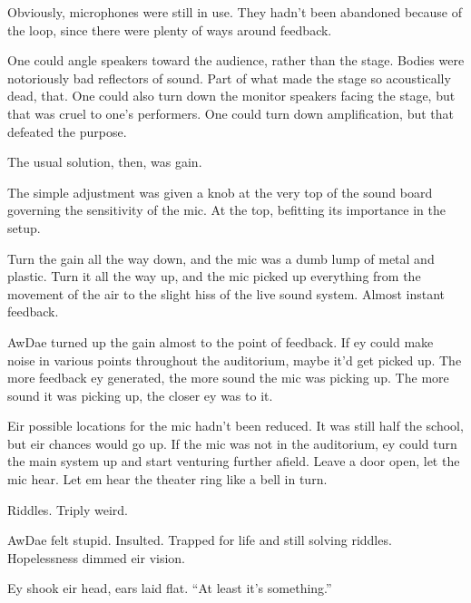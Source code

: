 Obviously, microphones were still in use. They hadn't been abandoned because of the loop, since there were plenty of ways around feedback.

One could angle speakers toward the audience, rather than the stage. Bodies were notoriously bad reflectors of sound. Part of what made the stage so acoustically dead, that. One could also turn down the monitor speakers facing the stage, but that was cruel to one's performers. One could turn down amplification, but that defeated the purpose.

The usual solution, then, was gain.

The simple adjustment was given a knob at the very top of the sound board governing the sensitivity of the mic. At the top, befitting its importance in the setup.

Turn the gain all the way down, and the mic was a dumb lump of metal and plastic. Turn it all the way up, and the mic picked up everything from the movement of the air to the slight hiss of the live sound system. Almost instant feedback.

AwDae turned up the gain almost to the point of feedback. If ey could make noise in various points throughout the auditorium, maybe it'd get picked up. The more feedback ey generated, the more sound the mic was picking up. The more sound it was picking up, the closer ey was to it.

Eir possible locations for the mic hadn't been reduced. It was still half the school, but eir chances would go up. If the mic was not in the auditorium, ey could turn the main system up and start venturing further afield. Leave a door open, let the mic hear. Let em hear the theater ring like a bell in turn.

Riddles. Triply weird.

AwDae felt stupid. Insulted. Trapped for life and still solving riddles. Hopelessness dimmed eir vision.

Ey shook eir head, ears laid flat. ``At least it's something.''
